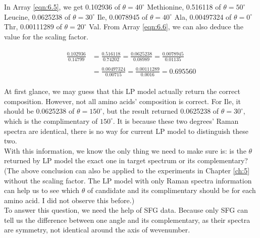 In Array \ref{eqn:6.5}, we get 0.102936 of $\theta = 40^{\circ}$ Methionine, 0.516118 of $\theta = 50^{\circ}$ Leucine, 0.0625238 of $\theta = 30^{\circ}$ Ile, 0.0078945 of $\theta = 40^{\circ}$ Ala, 0.00497324 of $\theta = 0^{\circ}$ Thr, 0.00111289 of $\theta = 20^{\circ}$ Val. From Array \ref{eqn:6.6}, we can also deduce the value for the scaling factor.

\begin{eqnarray} \label{eqn:6.6}
\begin{split}
\frac{0.102936}{0.14799} &= \frac{0.516118}{0.74202} = \frac{0.0625238}{0.08989}  =\frac{0.0078945}{0.01135}  
\\
\\
&= \frac{0.00497324}{0.00715} = \frac{0.00111289}{0.0016} = 0.695560
\end{split}
\end{eqnarray}


At first glance, we may guess that this LP model actually return the correct composition. However, not all amino acids' composition is correct. For Ile, it should be 0.0625238 of $\theta = 150^{\circ}$, but the result returned 0.0625238 of $\theta = 30^{\circ}$, which is the complimentary of $150^{\circ}$. It is because these two degrees' Raman spectra are identical, there is no way for current LP model to distinguish these two. \\

With this information, we know the only thing we need to make sure is: is the $\theta$ returned by LP model the exact one in target spectrum or its complementary? (The above conclusion can also be applied to the experiments in Chapter \ref{ch:5} without the scaling factor. The LP model with only Raman spectra information can help us to see which $\theta$ of candidate and its complimentary should be for each amino acid. I did not observe this before.)\\

To answer this question, we need the help of SFG data. Because only SFG can tell us the difference between one angle and its complementary, as their spectra are symmetry, not identical around the axis of wevenumber.\\

